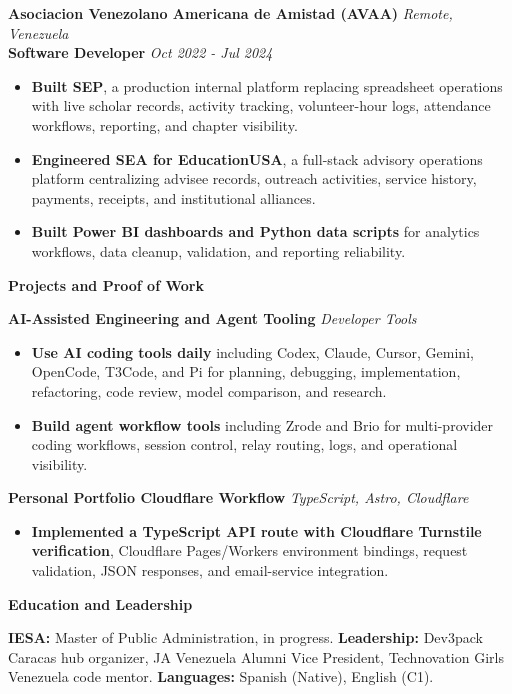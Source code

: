 \documentclass[10pt]{article}
\begin{document}
\vspace{3pt}
\textbf{Asociacion Venezolano Americana de Amistad (AVAA)} \hfill \textit{Remote, Venezuela} \\
\textbf{Software Developer} \hfill \textit{Oct 2022 - Jul 2024}
\begin{itemize}
    \item \textbf{Built SEP}, a production internal platform replacing spreadsheet operations with live scholar records, activity tracking, volunteer-hour logs, attendance workflows, reporting, and chapter visibility.
    \item \textbf{Engineered SEA for EducationUSA}, a full-stack advisory operations platform centralizing advisee records, outreach activities, service history, payments, receipts, and institutional alliances.
    \item \textbf{Built Power BI dashboards and Python data scripts} for analytics workflows, data cleanup, validation, and reporting reliability.
\end{itemize}

\vspace{4pt}
\begin{center}
    \textbf{Projects and Proof of Work}
\end{center}
\vspace{-6pt}

\textbf{AI-Assisted Engineering and Agent Tooling} \hfill \textit{Developer Tools}
\begin{itemize}
    \item \textbf{Use AI coding tools daily} including Codex, Claude, Cursor, Gemini, OpenCode, T3Code, and Pi for planning, debugging, implementation, refactoring, code review, model comparison, and research.
    \item \textbf{Build agent workflow tools} including Zrode and Brio for multi-provider coding workflows, session control, relay routing, logs, and operational visibility.
\end{itemize}

\vspace{3pt}
\textbf{Personal Portfolio Cloudflare Workflow} \hfill \textit{TypeScript, Astro, Cloudflare}
\begin{itemize}
    \item \textbf{Implemented a TypeScript API route with Cloudflare Turnstile verification}, Cloudflare Pages/Workers environment bindings, request validation, JSON responses, and email-service integration.
\end{itemize}

\vspace{4pt}
\begin{center}
    \textbf{Education and Leadership}
\end{center}
\vspace{-6pt}
\textbf{IESA:} Master of Public Administration, in progress. \textbf{Leadership:} Dev3pack Caracas hub organizer, JA Venezuela Alumni Vice President, Technovation Girls Venezuela code mentor. \textbf{Languages:} Spanish (Native), English (C1).
\end{document}
